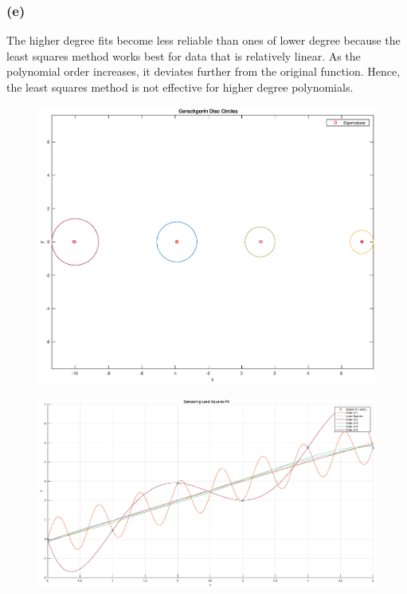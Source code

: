 \documentclass[10pt,a4paper]{article}
\numberwithin{equation}{section}
\begin{document}
	\subsubsection*{(e)}
	The higher degree fits become less reliable than ones of lower degree because the least squares method works best for data that is relatively linear. As the polynomial order increases, it deviates further from the original function. Hence, the least squares method is not effective for higher degree polynomials.
	
	
	\newpage
	
	\begin{figure}[h!]
	  \begin{sideways}
	  
	      \includegraphics[width=2\textwidth,center]{gersch.eps}
		  \end{sideways}
	  \centering
	  \label{pic:picture}
	\end{figure}
	
	\newpage
			
	\begin{figure}[hb!]
	\begin{sideways}
	\centering
				  \includegraphics[width=1.8\textwidth,right]{Q3_graphs.eps}
				
				  \end{sideways}
				  \label{fig:boat1}
				\end{figure}
	
\end{document}
